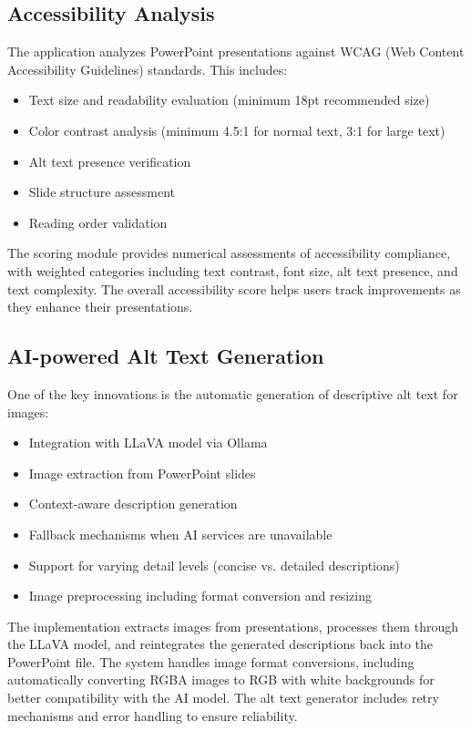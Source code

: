 \documentclass{article}
\begin{document}
\subsection{Accessibility Analysis}
The application analyzes PowerPoint presentations against WCAG (Web Content Accessibility Guidelines) standards. This includes:
\begin{itemize}
    \item Text size and readability evaluation (minimum 18pt recommended size)
    \item Color contrast analysis (minimum 4.5:1 for normal text, 3:1 for large text)
    \item Alt text presence verification
    \item Slide structure assessment
    \item Reading order validation
\end{itemize}

The scoring module provides numerical assessments of accessibility compliance, with weighted categories including text contrast, font size, alt text presence, and text complexity. The overall accessibility score helps users track improvements as they enhance their presentations.

\subsection{AI-powered Alt Text Generation}
One of the key innovations is the automatic generation of descriptive alt text for images:
\begin{itemize}
    \item Integration with LLaVA model via Ollama
    \item Image extraction from PowerPoint slides
    \item Context-aware description generation
    \item Fallback mechanisms when AI services are unavailable
    \item Support for varying detail levels (concise vs. detailed descriptions)
    \item Image preprocessing including format conversion and resizing
\end{itemize}

The implementation extracts images from presentations, processes them through the LLaVA model, and reintegrates the generated descriptions back into the PowerPoint file. The system handles image format conversions, including automatically converting RGBA images to RGB with white backgrounds for better compatibility with the AI model. The alt text generator includes retry mechanisms and error handling to ensure reliability.
\end{document}
